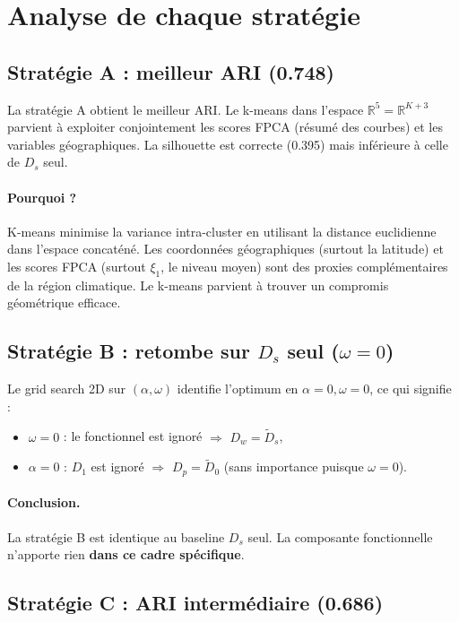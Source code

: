 \documentclass[11pt, a4paper]{article}
\newcommand{\R}{\mathbb{R}}
\newcommand{\Dp}{D_p}
\newcommand{\Dw}{D_w}
\theoremstyle{definition}
\theoremstyle{remark}
\begin{document}
\section{Analyse de chaque stratégie}

\subsection{Stratégie A : meilleur ARI (0.748)}

La stratégie A obtient le meilleur ARI. Le k-means dans l'espace
$\R^5 = \R^{K+3}$ parvient à exploiter conjointement les scores FPCA
(résumé des courbes) et les variables géographiques. La silhouette est
correcte (0.395) mais inférieure à celle de $D_s$ seul.

\paragraph{Pourquoi ?} K-means minimise la variance intra-cluster en utilisant
la distance euclidienne dans l'espace concaténé. Les coordonnées
géographiques (surtout la latitude) et les scores FPCA (surtout $\xi_1$,
le niveau moyen) sont des proxies complémentaires de la région climatique.
Le k-means parvient à trouver un compromis géométrique efficace.

\subsection{Stratégie B : retombe sur $D_s$ seul ($\omega = 0$)}

Le grid search 2D sur $(\alpha, \omega)$ identifie l'optimum en
$\alpha = 0, \omega = 0$, ce qui signifie :
\begin{itemize}[nosep]
  \item $\omega = 0$ : le fonctionnel est ignoré $\Rightarrow$ $\Dw = \tilde{D}_s$,
  \item $\alpha = 0$ : $D_1$ est ignoré $\Rightarrow$ $\Dp = \tilde{D}_0$ (sans importance puisque $\omega = 0$).
\end{itemize}

\paragraph{Conclusion.} La stratégie B est identique au baseline $D_s$ seul.
La composante fonctionnelle n'apporte rien \textbf{dans ce cadre spécifique}.

\subsection{Stratégie C : ARI intermédiaire (0.686)}
\end{document}
